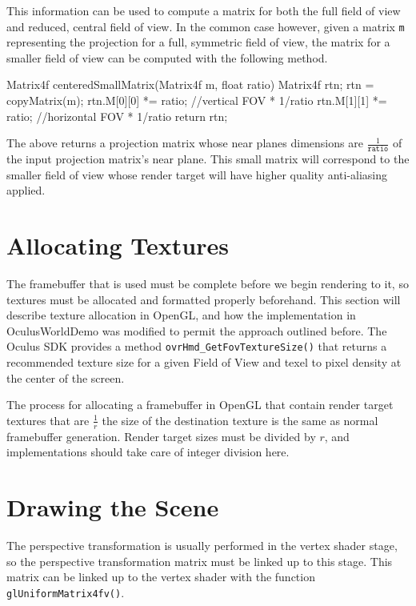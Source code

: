 \documentclass[12pt,a4paper,twoside,openright]{report}
\begin{document}
\noindent This information can be used to compute a matrix for both the full field of view and reduced, central field of view. In the common case however, given a matrix \texttt{m} representing the projection for a full, symmetric field of view, the matrix for a smaller field of view can be computed with the following method. \clearpage

\begin{blockcode}
Matrix4f centeredSmallMatrix(Matrix4f m, float ratio){
    Matrix4f rtn; 
    rtn = copyMatrix(m);
    rtn.M[0][0] *= ratio; //vertical FOV * 1/ratio
    rtn.M[1][1] *= ratio; //horizontal FOV * 1/ratio
    return rtn;
}
\end{blockcode}

\noindent The above returns a projection matrix whose near planes dimensions are $\frac{1}{\texttt{ratio}}$ of the input projection matrix's near plane. This small matrix will correspond to the smaller field of view whose render target will have higher quality anti-aliasing applied. 

\section{Allocating Textures}\label{texturealloc}

The framebuffer that is used must be complete before we begin rendering to it, so textures must be allocated and formatted properly beforehand. This section will describe texture allocation in OpenGL, and how the implementation in OculusWorldDemo was modified to permit the approach outlined before. The Oculus SDK provides a method \texttt{ovrHmd\_GetFovTextureSize()} that returns a recommended texture size for a given Field of View and texel to pixel density at the center of the screen.

The process for allocating a framebuffer in OpenGL that contain render target textures that are $\frac{1}{r}$ the size of the destination texture is the same as normal framebuffer generation. Render target sizes must be divided by $r$, and implementations should take care of integer division here.

\section{Drawing the Scene}

The perspective transformation is usually performed in the vertex shader stage, so the perspective transformation matrix must be linked up to this stage.
This matrix can be linked up to the vertex shader with the function \texttt{glUniformMatrix4fv()}.
\end{document}
